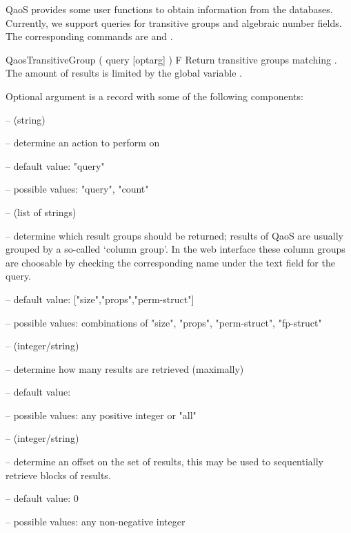 


QaoS provides some user functions to obtain information from the databases.
Currently, we support queries for transitive groups and algebraic number
fields.  The corresponding commands are  and
.




\> QaosTransitiveGroup ( query [optarg] ) F
  Return transitive groups matching .
The amount of results is limited by the global variable .

Optional argument  is a record with some of the following
components:
\beginlist
\item{--}  (string)
  \beginlist
  \item{--} determine an action to perform on 
  \item{--} default value: "query"
  \item{--} possible values: "query", "count"
  \endlist

\item{--}  (list of strings)
  \beginlist
  \item{--} determine which result groups should be returned; results of QaoS are
  usually grouped by a so-called `column group'.  In the web interface these
  column groups are choosable by checking the corresponding name under the text
  field for the query.
  \item{--} default value: ["size","props","perm-struct"]
  \item{--} possible values:
  combinations of "size", "props", "perm-struct", "fp-struct"
  \endlist

\item{--}  (integer/string)
  \beginlist
  \item{--} determine how many results are retrieved (maximally)
  \item{--} default value: 
  \item{--} possible values: any positive integer or "all"
  \endlist

\item{--}  (integer/string)
  \beginlist
  \item{--} determine an offset on the set of results, this may be used to
  sequentially retrieve blocks of results.
  \item{--} default value: 0
  \item{--} possible values: any non-negative integer
  \endlist
\endlist


